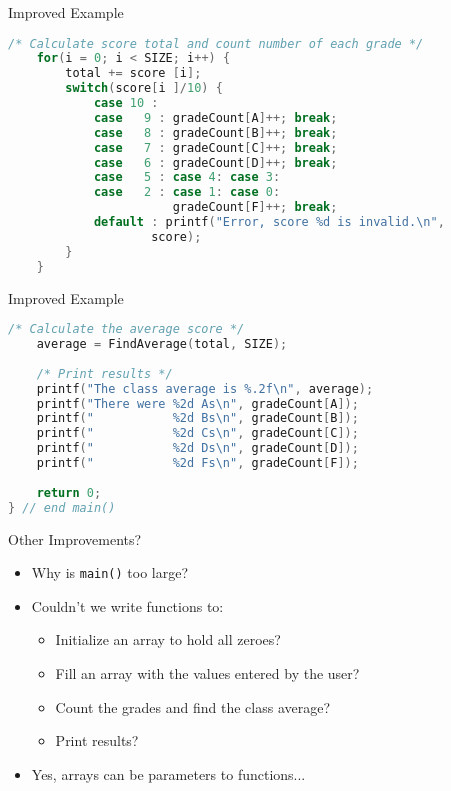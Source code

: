 \documentclass[graphics]{beamer}
\begin{document}
\begin{frame}[fragile]{Improved Example}
    \begin{lstlisting}[language=C,basicstyle=\footnotesize,keywordstyle=\color{blue},commentstyle=\color{green},showstringspaces=false,stringstyle=\color{red}]
    /* Calculate score total and count number of each grade */
    for(i = 0; i < SIZE; i++) {
        total += score [i];
        switch(score[i ]/10) {
            case 10 :
            case   9 : gradeCount[A]++; break;
            case   8 : gradeCount[B]++; break;
            case   7 : gradeCount[C]++; break;
            case   6 : gradeCount[D]++; break;
            case   5 : case 4: case 3:
            case   2 : case 1: case 0:
                       gradeCount[F]++; break;
            default : printf("Error, score %d is invalid.\n",
                    score);
        }
    }
    \end{lstlisting}
\end{frame}

\begin{frame}[fragile]{Improved Example}
    \begin{lstlisting}[language=C,basicstyle=\footnotesize,keywordstyle=\color{blue},commentstyle=\color{green},showstringspaces=false,stringstyle=\color{red}]
    /* Calculate the average score */
    average = FindAverage(total, SIZE);
    
    /* Print results */
    printf("The class average is %.2f\n", average);
    printf("There were %2d As\n", gradeCount[A]);
    printf("           %2d Bs\n", gradeCount[B]);
    printf("           %2d Cs\n", gradeCount[C]);
    printf("           %2d Ds\n", gradeCount[D]);
    printf("           %2d Fs\n", gradeCount[F]);
    
    return 0;
} // end main()
    \end{lstlisting}
\end{frame}

\begin{frame}{Other Improvements?}
    \begin{itemize}
        \item Why is \texttt{main()} too large?
        \item Couldn't we write functions to:
        \begin{itemize}
            \item Initialize an array to hold all zeroes?
            \item Fill an array with the values entered by the user?
            \item Count the grades and find the class average?
            \item Print results?
        \end{itemize}
        \item Yes, arrays can be parameters to functions...
    \end{itemize}
\end{frame}
\end{document}
